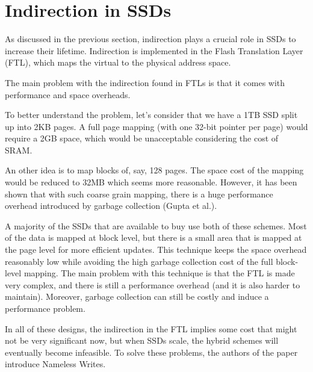\documentclass[twocolumn,a4paper,10pt]{article}
\begin{document}
\section*{Indirection in SSDs}
As discussed in the previous section, indirection plays a crucial role in
SSDs to increase their lifetime. Indirection is implemented in the Flash
Translation Layer (FTL), which maps the virtual to the physical address space. 

The main problem with the indirection found in FTLs is that it comes with
performance and space overheads.

To better understand the problem, let's consider that we have a 1TB SSD split
up into 2KB pages. A full page mapping (with one 32-bit pointer per page)
would require a 2GB space, which would be unacceptable considering the cost
of SRAM.

An other idea is to map blocks of, say, 128 pages. The space cost of the
mapping would be reduced to 32MB which seems more reasonable. However, it has
been shown that with such coarse grain mapping, there is a huge performance
overhead introduced by garbage collection (Gupta et al.).

A majority of the SSDs that are available to buy use both of these schemes.
Most of the data is mapped at block level, but there is a small area that is
mapped at the page level for more efficient updates. This technique keeps
the space overhead reasonably low while avoiding the high garbage collection
cost of the full block-level mapping. The main problem with this technique is
that the FTL is made very complex, and there is still a performance overhead
(and it is also harder to maintain). Moreover, garbage collection can still be
costly and induce a performance problem.

In all of these designs, the indirection in the FTL implies some cost that
might not be very significant now, but when SSDs scale, the hybrid schemes
will eventually become infeasible. To solve these problems, the authors of the
paper introduce Nameless Writes.
\end{document}

